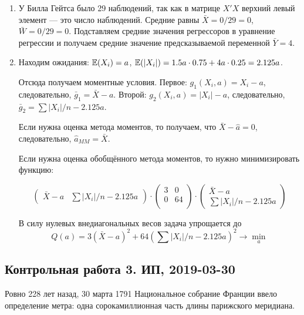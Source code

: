 \begin{enumerate}
\item У Билла Гейтса было 29 наблюдений, 
так как в матрице $X'X$ верхний левый элемент — это число наблюдений.
Средние равны $\bar X = 0/29=0$, $\bar W = 0/29 = 0$. 
Подставляем средние значения регрессоров в уравнение регрессии и получаем средние 
значение предсказываемой переменной $\bar Y = 4$. 
\item Находим ожидания: $\operatorname{\mathbb{E}}(X_i) = a$, $\operatorname{\mathbb{E}}(|X_i|) = 1.5a \cdot 0.75 + 4a \cdot 0.25 = 2.125a$.

Отсюда получаем моментные условия.
Первое: $g_1(X_i, a) = X_i - a$, следовательно, $\bar g_1 = \bar X - a$.
Второй: $g_2(X_i, a) = |X_i| - a$, следовательно, $\bar g_2 = \sum |X_i|/n - 2.125a$.

Если нужна оценка метода моментов, то получаем, что $\bar X - \hat a = 0$, 
следовательно, $\hat a_{MM} = \bar X$.

Если нужна оценка обобщённого метода моментов, то нужно минимизировать функцию:

\[
\begin{pmatrix}
  \bar X - a & \sum |X_i|/n - 2.125a
\end{pmatrix} \cdot 
\begin{pmatrix}
3 & 0 \\
0 & 64 \\
\end{pmatrix} \cdot 
\begin{pmatrix}
  \bar X - a \\ 
  \sum |X_i|/n - 2.125a
\end{pmatrix} 
\]

В силу нулевых внедиагональных весов задача упрощается до
\[
Q(a) = 3 (\bar X - a)^2   + 64 (\sum |X_i|/n - 2.125a)^2 \to \min_a
\]

\end{enumerate}


\subsection{Контрольная работа 3. ИП, 2019-03-30}




Ровно 228 лет назад, 30 марта 1791 Национальное собрание Франции ввело определение метра: одна сорокамиллионная часть длины парижского меридиана.


